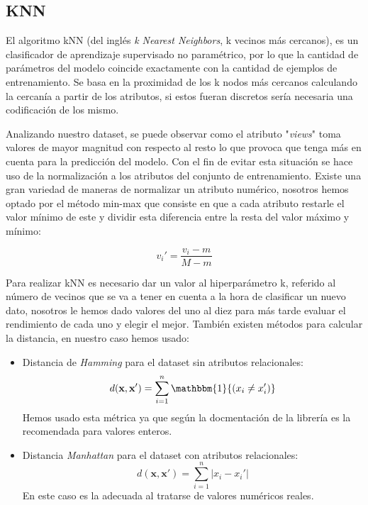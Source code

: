 \documentclass[conference,a4paper]{IEEEtran}
\begin{document}
\subsection{KNN}
El algoritmo kNN (del inglés \emph{k Nearest Neighbors}, k vecinos más cercanos), es un clasificador de aprendizaje supervisado no paramétrico, por lo que la cantidad de parámetros del modelo coincide exactamente con la cantidad de ejemplos de entrenamiento. Se basa en la proximidad de los k nodos más cercanos calculando la cercanía a partir de los atributos, si estos fueran discretos sería necesaria una codificación de los mismo. 

Analizando nuestro dataset, se puede observar como el atributo "\emph{views}" toma valores de mayor magnitud con respecto al resto lo que provoca que tenga más en cuenta para la predicción del modelo. Con el fin de evitar esta situación se hace uso de la normalización a los atributos del conjunto de entrenamiento. Existe una gran variedad de maneras de normalizar un atributo numérico, nosotros hemos optado por el método min-max \cite{b1} que consiste en que a cada atributo restarle el valor mínimo de este y dividir esta diferencia entre la resta del valor máximo y mínimo: 

\begin{equation}
v_{i}' = \frac{v_{i} - m}{M - m}
\end{equation}

Para realizar kNN es necesario dar un valor al hiperparámetro k, referido al número de vecinos que se va a tener en cuenta a la hora de clasificar un nuevo dato, nosotros le hemos dado valores del uno al diez para más tarde evaluar el rendimiento de cada uno y elegir el mejor. También existen métodos para calcular la distancia, en nuestro caso hemos usado:
\begin{itemize}
\item Distancia de \emph{Hamming} para el dataset sin atributos relacionales:
\begin{equation}
d(\textbf{x},\textbf{x}') = \sum_{i=1}^n \mathbbm{1}{(x_{i}\neq{x_{i}'})}
\end{equation}
Hemos usado esta métrica ya que según la docmentación de la librería \cite{b2} es la recomendada para valores enteros.
\\
\item Distancia \emph{Manhattan} para el dataset con atributos relacionales:
\begin{equation}
d(\textbf{x},\textbf{x}') = \sum_{i=1}^n |x_{i} - x_{i}'|
\end{equation}
En este caso es la adecuada al tratarse de valores numéricos reales.
\end{itemize}
\end{document}
